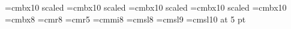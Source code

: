 \def \alf{\alpha}
\def \bet{\beta}
\def \gam{\gamma}
\def \del{\delta}
\def \eps{\epsilon}
\def \kap{\kappa}
\def \thet{\theta}
\def \sig{\sigma}
\def \ome{\omega}
\def \Alf{\Alpha}
\def \Bet{\Beta}
\def \Gam{\Gamma}
\def \Del{\Delta}
\def \Eps{\Epsilon}
\def \The{\Theta}
\def \Kap{\Kappa}
\def \Sig{\Sigma}
\def \Ome{\Omega}
%
\font\titoletto=cmbx10 scaled 
\font\titolino=cmbx10 scaled 
\font\titolo=cmbx10 scaled 
\font\titolone=cmbx10 scaled 
\font \bfla=cmbx10
\font \bfsm=cmbx8
\font \rmsm=cmr8
\font \rmvsm=cmr5
\font \itsm=cmmi8
\font \slsm=cmsl8
\font  \slsmed=cmsl9
\font \slvsm=cmsl10 at 5 pt

